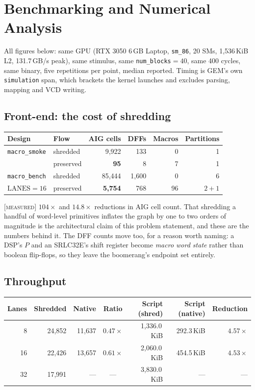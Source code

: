 \documentclass[11pt]{article}
\newcommand{\M}{\textcolor{blue!45!black}{\scriptsize\textsc{[measured]}}}
\newcommand{\code}[1]{\texttt{\small #1}}
\begin{document}
\section{Benchmarking and Numerical Analysis}\label{sec:bench}

All figures below: same GPU (RTX 3050 6\,GB Laptop, \code{sm\_86}, 20 SMs, 1,536\,KiB
L2, 131.7\,GB/s peak), same stimulus, same \code{num\_blocks}$=40$, same 400 cycles,
same binary, five repetitions per point, median reported. Timing is GEM's own
\code{simulation} span, which brackets the kernel launches and excludes parsing,
mapping and VCD writing.

\subsection{Front-end: the cost of shredding}

\begin{center}\small
\begin{tabular}{llrrrr}
\toprule
Design & Flow & AIG cells & DFFs & Macros & Partitions\\
\midrule
\code{macro\_smoke} & shredded  & 9,922 & 133 & 0 & 1\\
                    & preserved & \textbf{95} & 8 & 7 & 1\\
\midrule
\code{macro\_bench} & shredded  & 85,444 & 1,600 & 0 & 6\\
$\mathrm{LANES}=16$ & preserved & \textbf{5,754} & 768 & 96 & $2+1$\\
\bottomrule
\end{tabular}
\end{center}

\M{} $104\times$ and $14.8\times$ reductions in AIG cell count. That shredding a
handful of word-level primitives inflates the graph by one to two orders of magnitude
is the architectural claim of this problem statement, and these are the numbers behind
it. The DFF counts move too, for a reason worth naming: a DSP's $P$ and an SRLC32E's
shift register become \emph{macro word state} rather than boolean flip-flops, so they
leave the boomerang's endpoint set entirely.

\subsection{Throughput}

\begin{center}\small
\begin{tabular}{rrrcrrr}
\toprule
Lanes & Shredded & Native & Ratio & Script (shred) & Script (native) & Reduction\\
\midrule
 8 & 24,852 & 11,637 & $0.47\times$ & 1,336.0\,KiB & 292.3\,KiB & $4.57\times$\\
16 & 22,426 & 13,657 & $\mathbf{0.61\times}$ & 2,060.0\,KiB & 454.5\,KiB & $4.53\times$\\
32 & 17,991 & --- & --- & 3,830.0\,KiB & --- & ---\\
\bottomrule
\end{tabular}
\end{center}
\end{document}
